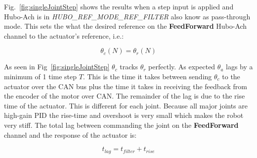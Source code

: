 Fig.~\ref{fig:singleJointStep} shows the results when a step input is applied and Hubo-Ach is in \textit{HUBO\_REF\_MODE\_REF\_FILTER} also know as pass-through mode.
This sets the what the desired reference on the \textbf{FeedForward} Hubo-Ach channel to the actuator's reference, i.e.:

\begin{equation}\label{eq:refrefmode}
 \theta_c(N) = \theta_r(N)
\end{equation}

As seen in Fig~\ref{fig:singleJointStep} $\theta_c$ tracks $\theta_r$ perfectly. As expected $\theta_a$ lags by a minimum of 1 time step $T$.  
This is the time it takes between sending $\theta_c$ to the actuator over the CAN bus plus the time it takes in receiving the feedback from the encoder of the motor over CAN.
The remainder of the lag is due to the rise time of the actuator.
This is different for each joint.
Because all major joints are high-gain PID the rise-time and overshoot is very small which makes the robot very stiff.
The total lag between commanding the joint on the \textbf{FeedForward} channel and the response of the actuator is:

\begin{equation}
t_{lag} = t_{filter} + t_{rise}
\end{equation}






